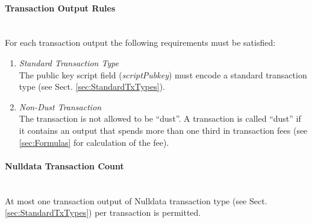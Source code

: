 \paragraph{Transaction Output Rules}~\\
For each transaction output the following requirements must be satisfied:
\begin{enumerate}[label=\arabic*), leftmargin=1cm]
\item \textit{Standard Transaction Type}~\\The public key script field (\textit{scriptPubkey}) must encode a standard transaction type (see Sect. \ref{sec:StandardTxTypes}).
\item \textit{Non-Dust Transaction}~\\The transaction is not allowed to be ``dust''. A transaction is called ``dust'' if it contains an output that spends more than one third in transaction fees (see \ref{sec:Formulas} for calculation of the fee).
\end{enumerate}

\paragraph{Nulldata Transaction Count}~\\
At most one transaction output of Nulldata transaction type (see Sect. \ref{sec:StandardTxTypes}) per transaction is permitted.
